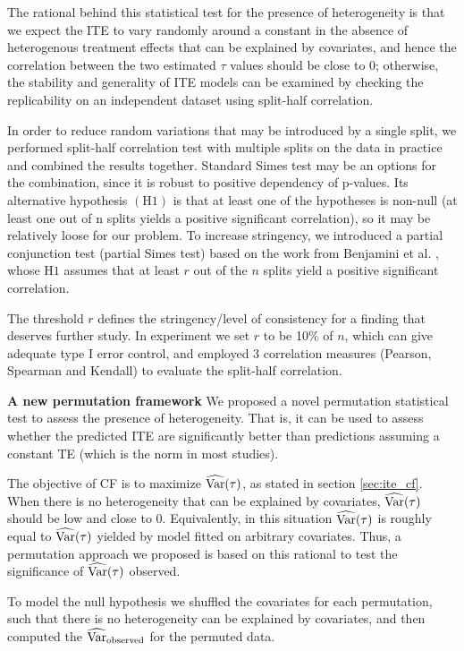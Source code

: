    The rational behind this statistical test for the presence of heterogeneity is that we expect the ITE to vary randomly around a constant in the absence of heterogenous treatment effects that can be explained by covariates, and hence the correlation between the two estimated $\tau$ values should be close to 0; otherwise, the stability and generality of ITE models can be examined by checking the replicability on an independent dataset using split-half correlation. 
    
    In order to reduce random variations that may be introduced by a single split, we performed split-half correlation test with multiple splits on the data in practice and combined the results together. Standard Simes test \cite{simes1986improved} may be an options for the combination, since it is robust to positive dependency of p-values. Its alternative hypothesis $(\mathrm{H1})$ is that at least one of the hypotheses is non-null (at least one out of n splits yields a positive significant correlation), so it may be relatively loose for our problem. To increase stringency, we introduced a partial conjunction test (partial Simes test) based on the work from Benjamini et al. \cite{benjamini2008screening}, whose $\mathrm{H1}$ assumes that at least $r$ out of the $n$ splits yield a positive significant correlation. 
    
    The threshold $r$ defines the stringency/level of consistency for a finding that deserves further study. In experiment we set $r$ to be 10\% of $n$, which can give adequate type I error control, and employed 3 correlation measures (Pearson, Spearman and Kendall) to evaluate the split-half correlation.
  
    \textbf{A new permutation framework} We proposed a novel permutation statistical test to assess the presence of heterogeneity. That is, it can be used to assess whether the predicted ITE are significantly better than predictions assuming a constant TE (which is the norm in most studies). 

    The objective of CF is to maximize $\operatorname{\widehat{Var}}(\tau)$, as stated in section \ref{sec:ite_cf}. When there is no heterogeneity that can be explained by covariates, $\operatorname{\widehat{Var}}(\tau)$ should be low and close to 0. Equivalently, in this situation $\operatorname{\widehat{Var}}(\tau)$ is roughly equal to $\operatorname{\widehat{Var}}(\tau)$ yielded by model fitted on arbitrary covariates. Thus, a permutation approach we proposed is based on this rational to test the significance of $\operatorname{\widehat{Var}}(\tau)$ observed. 
    
    To model the null hypothesis we shuffled the covariates for each permutation, such that there is no heterogeneity can be explained by covariates, and then computed the $\operatorname{\widehat{Var}}_\mathrm{observed}$ for the permuted data. 
    
